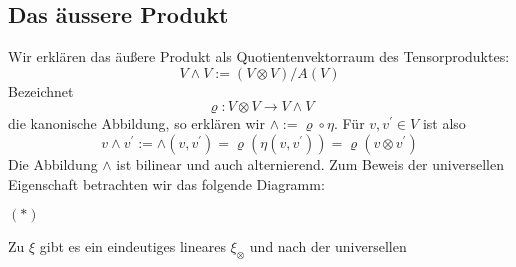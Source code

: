 \subsection{Das äussere Produkt}

Wir erklären das äußere Produkt als Quotientenvektorraum des Tensorproduktes:
\[
V \wedge V:=(V \otimes V) / A(V)
\]
Bezeichnet
\[
\varrho: V \otimes V \rightarrow V \wedge V
\]
die kanonische Abbildung, so erklären wir $\wedge:=\varrho \circ \eta .$
Für $v, v^{\prime} \in V$ ist also
\[
v \wedge v^{\prime}:=\wedge\left(v, v^{\prime}\right)=
\varrho\left(\eta\left(v, v^{\prime}\right)\right)=
\varrho\left(v \otimes v^{\prime}\right)
\]
Die Abbildung $\wedge$ ist bilinear und auch alternierend. Zum Beweis der
universellen Eigenschaft betrachten wir das folgende Diagramm:
\begin{center}
    \hspace{10pt} $(*)$
\end{center}
Zu $\xi$ gibt es ein eindeutiges lineares $\xi_{\otimes}$ und nach der universellen

